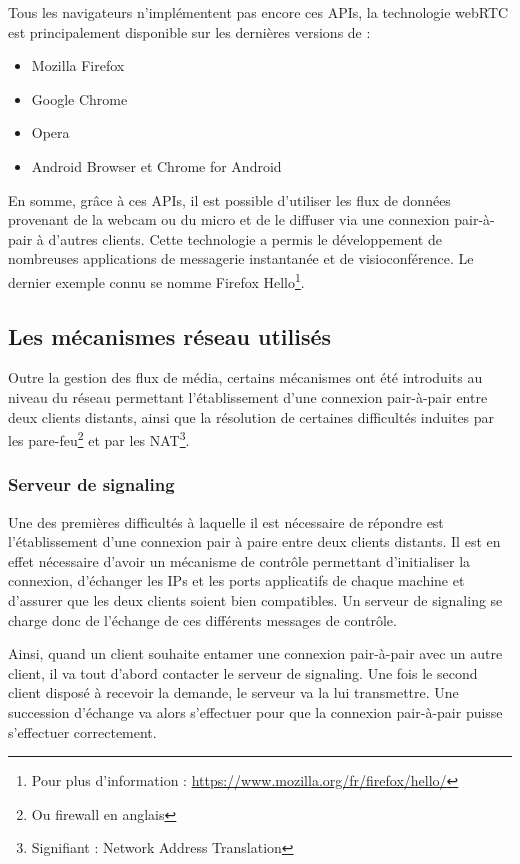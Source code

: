 \documentclass{tnreport}
\begin{document}
Tous les navigateurs n'implémentent pas encore ces APIs, la technologie webRTC est principalement disponible sur les dernières versions de :
\begin{itemize}
  \item Mozilla Firefox
  \item Google Chrome
  \item Opera
  \item Android Browser et Chrome for Android\\
\end{itemize}

En somme, grâce à ces APIs, il est possible d'utiliser les flux de données provenant de la webcam ou du micro et de le diffuser via une connexion pair-à-pair à d'autres clients. Cette technologie a permis le développement de nombreuses applications de messagerie instantanée et de visioconférence. Le dernier exemple connu se nomme Firefox Hello\footnote{Pour plus d'information : \url{https://www.mozilla.org/fr/firefox/hello/}}.

\subsection{Les mécanismes réseau utilisés}

Outre la gestion des flux de média, certains mécanismes ont été introduits au niveau du réseau permettant l'établissement d'une connexion pair-à-pair entre deux clients distants, ainsi que la résolution de certaines difficultés induites par les pare-feu\footnote{Ou firewall en anglais} et par les NAT\footnote{Signifiant : Network Address Translation}.

\subsubsection{Serveur de signaling}

Une des premières difficultés à laquelle il est nécessaire de répondre est l'établissement d'une connexion pair à paire entre deux clients distants. Il est en effet nécessaire d'avoir un mécanisme de contrôle permettant d'initialiser la connexion, d'échanger les IPs et les ports applicatifs de chaque machine et d'assurer que les deux clients soient bien compatibles. Un serveur de signaling se charge donc de l'échange de ces différents messages de contrôle. 

Ainsi, quand un client souhaite entamer une connexion pair-à-pair avec un autre client, il va tout d'abord contacter le serveur de signaling. Une fois le second client disposé à recevoir la demande, le serveur va la lui transmettre. Une succession d'échange va alors s'effectuer pour que la connexion pair-à-pair puisse s'effectuer correctement. 
\end{document}
